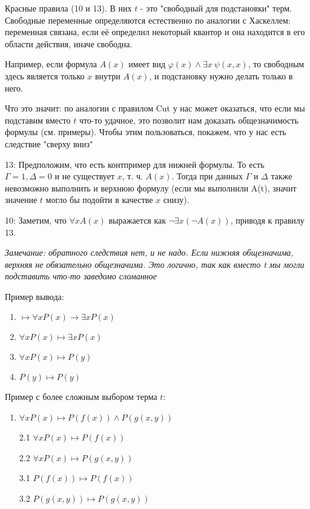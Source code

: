 Красные правила (10 и 13). В них $t$ - это "свободный для подстановки" терм. 
Свободные переменные определяются естественно по аналогии с Хаскеллем: переменная связана, если её определил некоторый квантор и она находится в его области действия, иначе свободна.

Например, если формула $A(x)$ имеет вид $\varphi(x) \land \exists x\ \psi(x, x)$, то свободным здесь является только $x$ внутри $A(x)$, и подстановку нужно делать только в него.

Что это значит: по аналогии с правилом Cut у нас может оказаться, что если мы подставим вместо $t$ что-то удачное, это позволит нам
доказать общезначимость формулы (см. примеры). Чтобы этим пользоваться, покажем, что у нас есть следствие "сверху вниз"

13: 
Предположим, что есть контпример для нижней формулы. То есть $\Gamma = 1, \Delta = 0$ и не существует $x$, т. ч. $A(x)$.
Тогда при данных $\Gamma$ и $\Delta$ также невозможно выполнить и верхнюю формулу (если мы выполнили A(t), значит значение $t$ могло бы подойти в качестве $x$ снизу).

10: Заметим, что $\forall x A(x)$ выражается как $\neg \exists x (\neg A(x))$, приводя к правилу 13.

\textit{Замечание: обратного следствия нет, и не надо. Если нижняя общезначима, верхняя не обязательно общезначима. Это логично, так как вместо t мы могли подставить
что-то заведомо сломанное}

Пример вывода:
\begin{enumerate}
    \item $\mapsto \forall x P(x) \to \exists x P(x)$
    \item $\forall x P(x) \mapsto \exists x P(x)$
    \item $\forall x P(x) \mapsto P(y)$
    \item $P(y) \mapsto P(y)$
\end{enumerate}

Пример с более сложным выбором терма $t$:
\begin{enumerate}
    \item $\forall x P(x) \mapsto P(f(x)) \land P(g(x, y))$
    \item [2.1] $\forall x P(x) \mapsto P(f(x))$
    \item [2.2] $\forall x P(x) \mapsto P(g(x, y))$
    \item [3.1] $P(f(x)) \mapsto P(f(x))$
    \item [3.2] $P(g(x, y)) \mapsto P(g(x, y))$
\end{enumerate}

